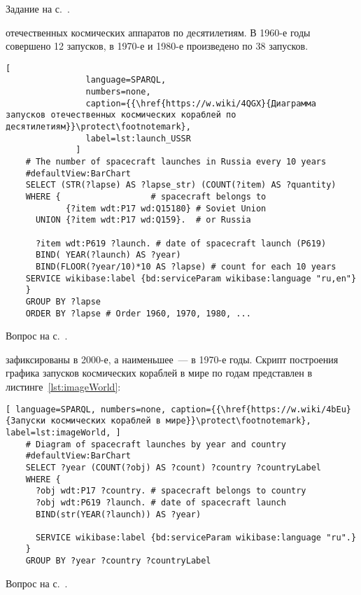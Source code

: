 \begin{task}
\small{Задание на с.~\pageref{question:ship_3}.}
\end{task}


\begin{task}
    \label{answer:launches_USSR}
     отечественных космических аппаратов по десятилетиям.
    В 1960-е годы совершено 12 запусков, в 1970-е и 1980-е произведено по 38 запусков.

    \begin{lstlisting}[ 
                language=SPARQL, 
                numbers=none, 
                caption={{\href{https://w.wiki/4QGX}{Диаграмма запусков отечественных космических кораблей по десятилетиям}}\protect\footnotemark}, 
                label=lst:launch_USSR
              ]
    # The number of spacecraft launches in Russia every 10 years
    #defaultView:BarChart
    SELECT (STR(?lapse) AS ?lapse_str) (COUNT(?item) AS ?quantity)
    WHERE {                  # spacecraft belongs to
            {?item wdt:P17 wd:Q15180} # Soviet Union
      UNION {?item wdt:P17 wd:Q159}.  # or Russia
      
      ?item wdt:P619 ?launch. # date of spacecraft launch (P619)
      BIND( YEAR(?launch) AS ?year) 
      BIND(FLOOR(?year/10)*10 AS ?lapse) # count for each 10 years
    SERVICE wikibase:label {bd:serviceParam wikibase:language "ru,en"}
    } 
    GROUP BY ?lapse
    ORDER BY ?lapse # Order 1960, 1970, 1980, ...
    \end{lstlisting}
    \small{Вопрос на с.~\pageref{question:spacecraft_1}.}
\end{task}

\begin{task}
    \label{answer:launches_world}
    зафиксированы в 2000-е, а наименьшее~--- в 1970-е годы. 
    Скрипт построения графика запусков космических кораблей в мире по годам представлен в листинге~\ref{lst:imageWorld}:
    \begin{lstlisting}[ language=SPARQL, numbers=none, caption={{\href{https://w.wiki/4bEu}{Запуски космических кораблей в мире}}\protect\footnotemark}, label=lst:imageWorld, ]
    # Diagram of spacecraft launches by year and country
    #defaultView:BarChart
    SELECT ?year (COUNT(?obj) AS ?count) ?country ?countryLabel
    WHERE {
      ?obj wdt:P17 ?country. # spacecraft belongs to country 
      ?obj wdt:P619 ?launch. # date of spacecraft launch
      BIND(str(YEAR(?launch)) AS ?year)
      
      SERVICE wikibase:label {bd:serviceParam wikibase:language "ru".}
    }
    GROUP BY ?year ?country ?countryLabel
    \end{lstlisting}
    \small{Вопрос на с.~\pageref{question:spacecraft_2}.}
\end{task}

